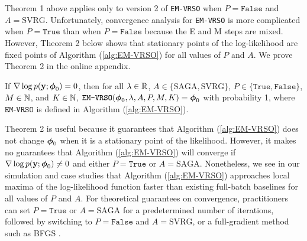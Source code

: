 

Theorem 1 above applies only to version 2 of \texttt{EM-VRSO} when $P = \texttt{False}$ and $A = \text{SVRG}$. Unfortunately, convergence analysis for \texttt{EM-VRSO} is more complicated when $P = \texttt{True}$ than when $P = \texttt{False}$ because the E and M steps are mixed. However, Theorem 2 below shows that stationary points of the log-likelihood are fixed points of Algorithm (\ref{alg:EM-VRSO}) for all values of $P$ and $A$. We prove Theorem 2 in the online appendix. 

\begin{theorem}
    If $\nabla \log p(\mathbf{y};\boldsymbol{\phi}_0) = 0$, then for all $\lambda \in \mathbb{R}$, $A \in \{\text{SAGA}, \text{SVRG}\}$, $P \in \{\texttt{True},\texttt{False}\}$, $M \in \mathbb{N}$, and $K \in \mathbb{N}$, $\texttt{EM-VRSO}(\boldsymbol{\phi}_0, \lambda, A, P, M, K) = \boldsymbol{\phi}_0$ with probability 1, where $\texttt{EM-VRSO}$ is defined in Algorithm (\ref{alg:EM-VRSO}).
\end{theorem}

Theorem 2 is useful because it guarantees that Algorithm (\ref{alg:EM-VRSO}) does not change $\boldsymbol{\phi}_0$ when it is a stationary point of the likelihood. However, it makes no guarantees that Algorithm (\ref{alg:EM-VRSO}) will converge if $\nabla \log p(\mathbf{y};\boldsymbol{\phi}_0) \neq 0$ and either $P = \texttt{True}$ or $A = \text{SAGA}$. Nonetheless, we see in our simulation and case studies that Algorithm (\ref{alg:EM-VRSO})  approaches local maxima of the log-likelihood function faster than existing full-batch baselines for all values of $P$ and $A$. For theoretical guarantees on convergence, practitioners can set $P = \texttt{True}$ or $A = \text{SAGA}$ for a predetermined number of iterations, followed by switching to $P = \texttt{False}$ and $A = \text{SVRG}$, or a full-gradient method such as BFGS \citep{Fletcher:2000}.


